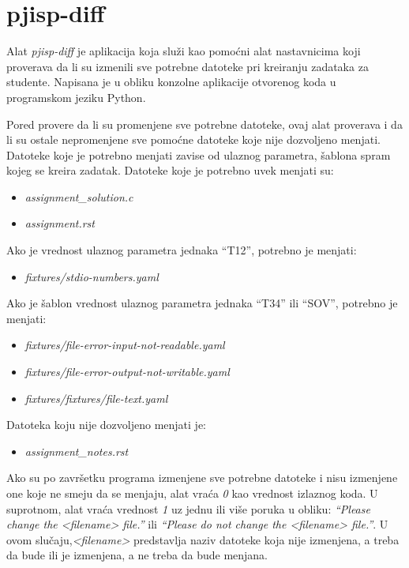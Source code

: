 \documentclass[12pt]{report}
\begin{document}
\section{pjisp-diff}

Alat \textit{pjisp-diff} \cite{pjisp-diff} je aplikacija koja služi kao pomoćni alat nastavnicima koji proverava da li su izmenili sve potrebne datoteke pri kreiranju zadataka za studente. Napisana je u obliku konzolne aplikacije otvorenog koda u programskom jeziku Python.

Pored provere da li su promenjene sve potrebne datoteke, ovaj alat proverava i da li su ostale nepromenjene sve pomoćne datoteke koje nije dozvoljeno menjati. Datoteke koje je potrebno menjati zavise od ulaznog parametra, šablona spram kojeg se kreira zadatak. Datoteke koje je potrebno uvek menjati su:

\begin{itemize}
    \item \textit{assignment\_solution.c}
    \item \textit{assignment.rst}
\end{itemize}

Ako je vrednost ulaznog parametra jednaka ``T12'', potrebno je menjati:

\begin{itemize}
    \item \textit{fixtures/stdio-numbers.yaml}
\end{itemize}

Ako je šablon vrednost ulaznog parametra jednaka ``T34'' ili ``SOV'', potrebno je menjati:

\begin{itemize}
    \item \textit{fixtures/file-error-input-not-readable.yaml}
    \item \textit{fixtures/file-error-output-not-writable.yaml}
    \item \textit{fixtures/fixtures/file-text.yaml}
\end{itemize}

Datoteka koju nije dozvoljeno menjati je:

\begin{itemize}
    \item \textit{assignment\_notes.rst}
\end{itemize}

Ako su po završetku programa izmenjene sve potrebne datoteke i nisu izmenjene one koje ne smeju da se menjaju, alat vraća \textit{0} kao vrednost izlaznog koda. U suprotnom, alat vraća vrednost \textit{1} uz jednu ili više poruka u obliku: \textit{``Please change the <filename> file.''} ili \textit{``Please do not change the <filename> file.''}. U ovom slučaju,\textit{<filename>} predstavlja naziv datoteke koja nije izmenjena, a treba da bude ili je izmenjena, a ne treba da bude menjana.
\end{document}

